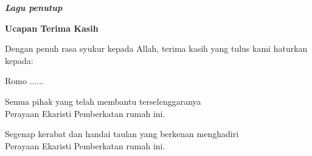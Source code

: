 \documentclass[12pt]{book}
\makeatletter
\newcommand{\judul}[1]{%
  {\parindent \z@ \centering \normalfont
    \interlinepenalty\@M \Large \bfseries #1\par\nobreak \vskip 20\p@ }}
\newcommand{\lagu}[1]{%
  {\parindent \z@ \normalfont
    \interlinepenalty\@M \bfseries \emph{#1}\par\nobreak \vskip 20\p@ }}
\newcommand{\romo}{...... }
\makeatother
\begin{document}
\lagu{Lagu penutup}
\newpage
\thispagestyle{empty}
\judul{Ucapan Terima Kasih}
\begin{center}

Dengan penuh rasa syukur kepada Allah, terima kasih yang tulus kami haturkan kepada:

Romo \romo \vspace{0.5cm}

Semua pihak yang telah membantu terselenggaranya \\
Perayaan Ekaristi Pemberkatan rumah ini.\vspace{0.5cm}

Segenap kerabat dan handai taulan yang berkenan menghadiri\\
Perayaan Ekaristi Pemberkatan rumah ini.\vspace{0.5cm}

\end{center}
\end{document}

